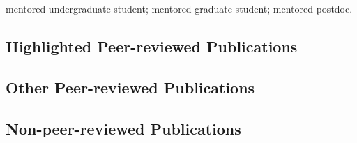 


\newcommand{\docTitle}{Publication List\xspace}


\singlespacing


% 

\ugsymbol{}mentored undergraduate student;
\phdsymbol{}mentored graduate student;
\postdocsymbol{}mentored postdoc.


\subsection*{Highlighted Peer-reviewed Publications}
\nocite{*}
\printbibliography[filter=highlightedpapersnopreprints, heading=none]

\subsection*{Other Peer-reviewed Publications}
\nocite{*}
\printbibliography[filter=cvpapersnohighlightsnopreprints, heading=none]

\subsection*{Non-peer-reviewed Publications}



